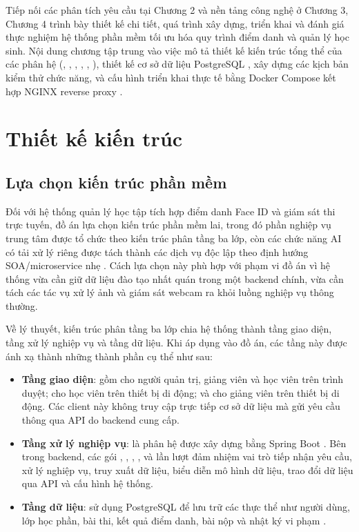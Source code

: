 \documentclass[../DoAn.tex]{subfiles}
\begin{document}
Tiếp nối các phân tích yêu cầu tại Chương 2 và nền tảng công nghệ ở Chương 3, Chương 4 trình bày thiết kế chi tiết, quá trình xây dựng, triển khai và đánh giá thực nghiệm hệ thống phần mềm tối ưu hóa quy trình điểm danh và quản lý học sinh. Nội dung chương tập trung vào việc mô tả thiết kế kiến trúc tổng thể của các phân hệ (, , , , , ), thiết kế cơ sở dữ liệu PostgreSQL \cite{postgresql_docs2026}, xây dựng các kịch bản kiểm thử chức năng, và cấu hình triển khai thực tế bằng Docker Compose \cite{docker_compose_docs2026} kết hợp NGINX reverse proxy \cite{nginx_docs2026}.

\section{Thiết kế kiến trúc}
\label{section:4.1}
\subsection{Lựa chọn kiến trúc phần mềm}
\label{subsection:4.1.1}
Đối với hệ thống quản lý học tập tích hợp điểm danh Face ID và giám sát thi trực tuyến, đồ án lựa chọn kiến trúc phần mềm lai, trong đó phần nghiệp vụ trung tâm được tổ chức theo kiến trúc phân tầng ba lớp, còn các chức năng AI có tải xử lý riêng được tách thành các dịch vụ độc lập theo định hướng SOA/microservice nhẹ \cite{newman2021buildingmicroservices}. Cách lựa chọn này phù hợp với phạm vi đồ án vì hệ thống vừa cần giữ dữ liệu đào tạo nhất quán trong một backend chính, vừa cần tách các tác vụ xử lý ảnh và giám sát webcam ra khỏi luồng nghiệp vụ thông thường.

Về lý thuyết, kiến trúc phân tầng ba lớp chia hệ thống thành tầng giao diện, tầng xử lý nghiệp vụ và tầng dữ liệu. Khi áp dụng vào đồ án, các tầng này được ánh xạ thành những thành phần cụ thể như sau:
\begin{itemize}
    \item \textbf{Tầng giao diện}: gồm  cho người quản trị, giảng viên và học viên trên trình duyệt;  cho học viên trên thiết bị di động; và  cho giảng viên trên thiết bị di động. Các client này không truy cập trực tiếp cơ sở dữ liệu mà gửi yêu cầu thông qua API do backend cung cấp.
    \item \textbf{Tầng xử lý nghiệp vụ}: là phân hệ  được xây dựng bằng Spring Boot \cite{spring_boot_docs2026}. Bên trong backend, các gói , , , ,  và  lần lượt đảm nhiệm vai trò tiếp nhận yêu cầu, xử lý nghiệp vụ, truy xuất dữ liệu, biểu diễn mô hình dữ liệu, trao đổi dữ liệu qua API và cấu hình hệ thống.
    \item \textbf{Tầng dữ liệu}: sử dụng PostgreSQL để lưu trữ các thực thể như người dùng, lớp học phần, bài thi, kết quả điểm danh, bài nộp và nhật ký vi phạm \cite{postgresql_docs2026}.
\end{itemize}
\end{document}
